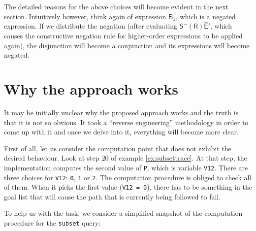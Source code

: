 \documentclass[inscr,ack,preface]{dithesis}
\theoremstyle{definition}
\newcommand{\msf}[1]{$\mathsf{#1}$}
\begin{document}
The detailed reasons for the above choices will become evident in the next section. Intuitively however, think again of expression \msf{B_1}, which is a negated expression. If we distribute the negation (after evaluating \msf{S^{-} \left( R \right) \widehat{E}'}, which causes the constructive negation rule for higher-order expressions to be applied again), the disjunction will become a conjunction and its expressions will become negated.


\section{Why the approach works}
It may be initially unclear why the proposed approach works and the truth is that it is not so obvious. It took a ``reverse engineering'' methodology in order to come up with it and once we delve into it, everything will become more clear.

First of all, let us consider the computation point that does not exhibit the desired behaviour. Look at step 20 of example \ref{ex:subsettrace}. At that step, the implementation computes the second value of \texttt{P}, which is variable \texttt{V12}. There are three choices for \texttt{V12}: \texttt{0}, \texttt{1} or \texttt{2}. The computation procedure is obliged to check all of them. When it picks the first value (\texttt{V12 = 0}), there has to be something in the goal list that will cause the path that is currently being followed to fail.

To help us with the task, we consider a simplified snapshot of the computation procedure for the \texttt{subset} query:
\end{document}
